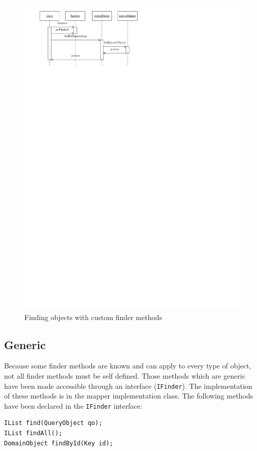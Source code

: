 			\begin{figure}[htb]
				\begin{center}
					\includegraphics{./files/inc/figures/DesignFind}
					\caption{\label{fig:designFind}Finding objects with custom finder methods}
				\end{center}
			\end{figure}
			
		\subsection{Generic}
		\label{subsec:genericFinder}
			Because some finder methods are known and can apply to every type of object, not all finder methods must
			be self defined. Those methods which are generic have been made accessible through an interface (\verb~IFinder~).
			The implementation of these methods is in the mapper implementation class. 
			The following methods have been declared in the \verb~IFinder~ interface:
			\begin{Verbatim}
IList find(QueryObject qo);
IList findAll();
DomainObject findById(Key id);
			\end{Verbatim}
			
